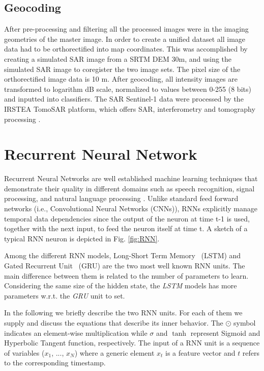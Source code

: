 \documentclass[journal, onecolumn]{IEEEtran}
\begin{document}
\subsection{Geocoding}

After pre-processing and filtering all the processed images
were in the imaging geometries of the master image. In order to create a unified dataset all image data had to be orthorectified into map coordinates. This was accomplished by creating a simulated SAR image from a SRTM DEM 30m, and using the simulated SAR image to coregister the two image sets. The pixel size of the orthorectified image data is 10 m. After geocoding, all intensity images are transformed to logarithm dB scale, normalized to values between 0-255 (8 bits) and inputted into classifiers. The SAR Sentinel-1 data  were processed by the IRSTEA TomoSAR platform, which offers SAR, interferometry and tomography processing  \cite{DinhLPS2016}. 


\section{Recurrent Neural Network\label{sec:RNN}}
Recurrent Neural Networks are well established machine learning techniques that demonstrate their quality in different domains such as speech recognition, signal processing, and natural language processing \cite{SomaMSFN15,LinzenDG16}. Unlike standard feed forward networks (i.e., Convolutional Neural Networks (CNNs)), RNNs explicitly manage temporal data dependencies since the output of the neuron at time t-1 is used, together with the next input, to feed the neuron itself at time t. A sketch of a typical RNN neuron is depicted in Fig. \ref{fig:RNN}. 

Among the different RNN models, Long-Short Term Memory~\cite{HochreiterS96} (LSTM) and Gated Recurrent Unit~\cite{ChoMGBBSB14} (GRU) are the two most well known RNN units. The main difference between them is related to the number of parameters to learn. Considering the same size of the hidden state, the \textit{LSTM} models has more parameters w.r.t. the \textit{GRU} unit to set.

In the following we briefly describe the two RNN units.
For each of them we supply and discuss the equations that describe its inner behavior. The $\odot$ symbol indicates an element-wise multiplication while $\sigma$ and $\tanh$ represent Sigmoid and Hyperbolic Tangent function, respectively.
The input of a RNN unit is a sequence of variables ($x_1$, ..., $x_N$) where a generic element $x_t$ is a feature vector and $t$ refers to the corresponding timestamp.
\end{document}
